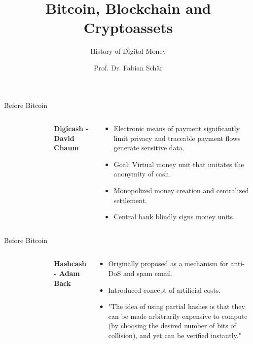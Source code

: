 \documentclass[]{beamer}
\title{Bitcoin, Blockchain and Cryptoassets}
\subtitle{History of Digital Money}
\author{Prof. Dr. Fabian Schär}
\institute{University of Basel}
\begin{document}
\thispagestyle{empty}
\begin{frame}[noframenumbering]
	\titlepage
\end{frame}



\begin{frame}{Before Bitcoin}
\begin{columns}
		\begin{figure}
			\begin{tikzpicture}[scale=1]
					
			\end{tikzpicture}
		\end{figure}
		\textbf{Digicash - David Chaum}
		\vspace{0.5em}
		\begin{small}
		\begin{itemize}
			\item Electronic means of payment significantly limit privacy and traceable payment flows generate sensitive data.
			\item Goal: Virtual money unit that imitates the anonymity of cash.
			\item Monopolized money creation and centralized settlement.
			\item Central bank blindly signs money units.
		\end{itemize}
		\end{small}	
\end{columns}
\end{frame}



\begin{frame}{Before Bitcoin}
\begin{columns}
\begin{figure}
	\begin{tikzpicture}[scale=1]
			
	\end{tikzpicture}
\end{figure}
	\textbf{Hashcash - Adam Back}
	\vspace{0.5em}
	\begin{small}
	\begin{itemize}
		\item Originally proposed as a mechanism for anti-DoS and spam email.
		\item Introduced concept of artificial costs.
		\item "The idea of using partial hashes is that they can be made arbitrarily expensive to compute (by choosing the desired number of bits of collision), and yet can be verified instantly."
	\end{itemize}
	\end{small}
\end{columns}
\end{frame}
\end{document}

